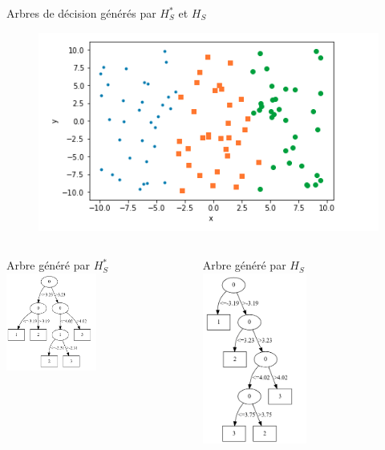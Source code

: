 \documentclass[usenames,dvipsnames]{beamer}
\begin{document}
\begin{frame}{Arbres de décision générés par $H^*_S$ et $H_S$}
    \begin{figure}
    	\includegraphics[width=.35\textwidth]{Capture_d__cran_de_2018-07-11_20-06-25.png}
    \end{figure}
    \begin{columns}
        \begin{column}{0.45\textwidth}
            \centering
            Arbre généré par $H^*_S$\\
            \includegraphics[width=0.5\textwidth]{rsdm-tree-artificial.png}
            \vspace*{2.5cm}
        \end{column}
        \begin{column}{0.45\textwidth}
            \centering
            Arbre généré par $H_S$
	    \includegraphics[width=0.5\textwidth]{sdm-tree-artificial.png}
        \end{column}
    \end{columns}
\end{frame}
\end{document}
